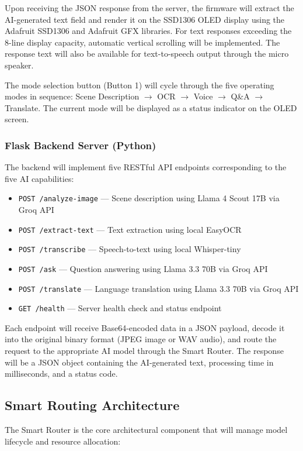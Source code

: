Upon receiving the JSON response from the server, the firmware will extract the AI-generated text field and render it on the SSD1306 OLED display using the Adafruit SSD1306 and Adafruit GFX libraries. For text responses exceeding the 8-line display capacity, automatic vertical scrolling will be implemented. The response text will also be available for text-to-speech output through the micro speaker.

The mode selection button (Button 1) will cycle through the five operating modes in sequence: Scene Description $\rightarrow$ OCR $\rightarrow$ Voice $\rightarrow$ Q\&A $\rightarrow$ Translate. The current mode will be displayed as a status indicator on the OLED screen.

\subsubsection*{Flask Backend Server (Python)}
The backend will implement five RESTful API endpoints corresponding to the five AI capabilities:

\begin{itemize}[leftmargin=1.5cm]
\item \texttt{POST /analyze-image} --- Scene description using Llama 4 Scout 17B via Groq API
\item \texttt{POST /extract-text} --- Text extraction using local EasyOCR
\item \texttt{POST /transcribe} --- Speech-to-text using local Whisper-tiny
\item \texttt{POST /ask} --- Question answering using Llama 3.3 70B via Groq API
\item \texttt{POST /translate} --- Language translation using Llama 3.3 70B via Groq API
\item \texttt{GET /health} --- Server health check and status endpoint
\end{itemize}

Each endpoint will receive Base64-encoded data in a JSON payload, decode it into the original binary format (JPEG image or WAV audio), and route the request to the appropriate AI model through the Smart Router. The response will be a JSON object containing the AI-generated text, processing time in milliseconds, and a status code.

\subsection{Smart Routing Architecture}
The Smart Router is the core architectural component that will manage model lifecycle and resource allocation:

